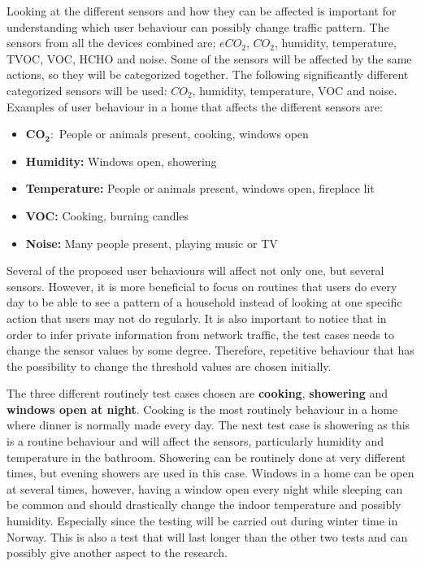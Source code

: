 Looking at the different sensors and how they can be affected is important for understanding which user behaviour can possibly change traffic pattern. The sensors from all the devices combined are; \(eCO_2\), \(CO_2\), humidity, temperature, \gls{TVOC}, \gls{VOC}, HCHO and noise. Some of the sensors will be affected by the same actions, so they will be categorized together. The following significantly different categorized sensors will be used: \(CO_2\), humidity, temperature, VOC and noise. Examples of user behaviour in a home that affects the different sensors are:
\begin{itemize}
    \item $\mathbf{CO_2:}$ People or animals present, cooking, windows open
    \item \textbf{Humidity:} Windows open, showering
    \item \textbf{Temperature:} People or animals present, windows open, fireplace lit
    \item \textbf{VOC:} Cooking, burning candles
    \item \textbf{Noise:} Many people present, playing music or TV
\end{itemize}

Several of the proposed user behaviours will affect not only one, but several sensors. However, it is more beneficial to focus on routines that users do every day to be able to see a pattern of a household instead of looking at one specific action that users may not do regularly. It is also important to notice that in order to infer private information from network traffic, the test cases needs to change the sensor values by some degree. Therefore, repetitive behaviour that has the possibility to change the threshold values are chosen initially. 

The three different routinely test cases chosen are \textbf{cooking}, \textbf{showering} and \textbf{windows open at night}. Cooking is the most routinely behaviour in a home where dinner is normally made every day. The next test case is showering as this is a routine behaviour and will affect the sensors, particularly humidity and temperature in the bathroom. Showering can be routinely done at very different times, but evening showers are used in this case. Windows in a home can be open at several times, however, having a window open every night while sleeping can be common and should drastically change the indoor temperature and possibly humidity. Especially since the testing will be carried out during winter time in Norway. This is also a test that will last longer than the other two tests and can possibly give another aspect to the research. 

